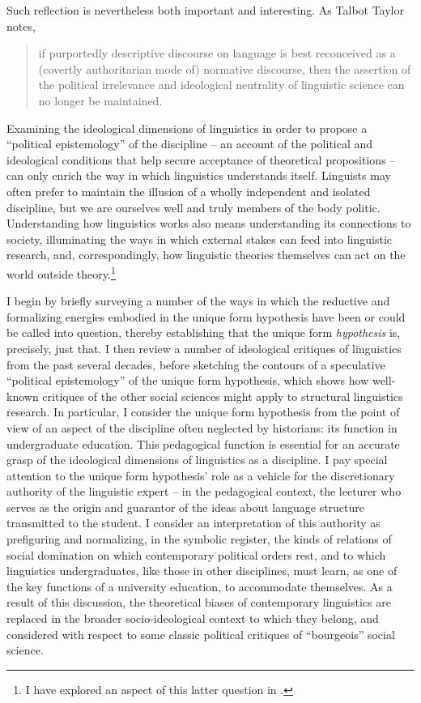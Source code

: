 \documentclass[output=paper]{langscibook}
\begin{document}
Such reflection is nevertheless both important and interesting. As Talbot Taylor notes, 

\begin{quotation}
if purportedly descriptive discourse on language is best reconceived as a (covertly authoritarian mode of) normative discourse, then the assertion of the political irrelevance and ideological neutrality of linguistic science can no longer be maintained. \citep[25]{Taylor1990}
\end{quotation}

\noindent Examining the ideological dimensions of linguistics in order to propose a ``political epistemology'' of the discipline -- an account of the political and ideological conditions that help secure acceptance of theoretical propositions -- can only enrich the way in which linguistics understands itself. Linguists may often prefer to maintain the illusion of a wholly independent and isolated discipline, but we are ourselves well and truly members of the body politic. Understanding how linguistics works also means understanding its connections to society, illuminating the ways in which external stakes can feed into linguistic research, and, correspondingly, how linguistic theories themselves can act on the world outside theory.\footnote{I have explored an aspect of this latter question in \citet{Riemer2019}.}

I begin by briefly surveying a number of the ways in which the reductive and formalizing energies embodied in the unique form hypothesis have been or could be called into question, thereby establishing that the unique form \emph{hypothesis} is, precisely, just that. I then review a number of ideological critiques of linguistics from the past several decades, before sketching the contours of a speculative ``political epistemology'' of the unique form hypothesis, which shows how well-known critiques of the other social sciences might apply to structural linguistics research. In particular, I consider the unique form hypothesis from the point of view of an aspect of the discipline often neglected by historians: its function in undergraduate education. This pedagogical function is essential for an accurate grasp of the ideological dimensions of linguistics as a discipline. I pay special attention to the unique form hypothesis' role as a vehicle for the discretionary authority of the linguistic expert -- in the pedagogical context, the lecturer who serves as the origin and guarantor of the ideas about language structure transmitted to the student. I consider an interpretation of this authority as prefiguring and normalizing, in the symbolic register, the kinds of relations of social domination on which contemporary political orders rest, and to which linguistics undergraduates, like those in other disciplines, must learn, as one of the key functions of a university education, to accommodate themselves. As a result of this discussion, the theoretical biases of contemporary linguistics are replaced in the broader socio-ideological context to which they belong, and considered with respect to some classic political critiques of ``bourgeois'' social science.
\end{document}
